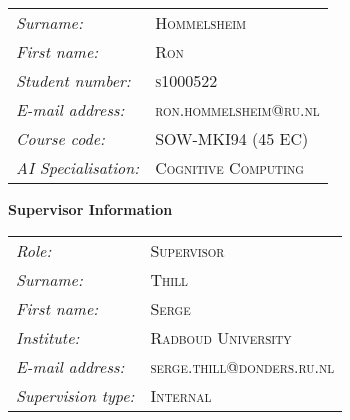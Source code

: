     \begin{tabular}{L{3cm}l}
                \emph{Surname:} & \textsc{Hommelsheim} \\
                \emph{First name:} & \textsc{Ron} \\
                \emph{Student number:} & \textsc{s1000522} \\
                \emph{E-mail address:} & \textsc{ron.hommelsheim@ru.nl} \\
                \emph{Course code:} & \textsc{SOW-MKI94 (45 EC)} \\
                \emph{AI Specialisation:} & \textsc{Cognitive Computing} \\
        \end{tabular}
	
  \vspace{1cm}
  \textbf{Supervisor Information} \\

    \begin{tabular}{L{3cm}l}
            \emph{Role:} & \textsc{Supervisor} \\
            \emph{Surname:} & \textsc{Thill} \\
            \emph{First name:} & \textsc{Serge} \\
            \emph{Institute:} & \textsc{Radboud University} \\
            \emph{E-mail address:} & \textsc{serge.thill@donders.ru.nl} \\
            \emph{Supervision type:} & \textsc{Internal} \\
    \end{tabular}



\clearpage
\listoftodos[Notes]
\clearpage